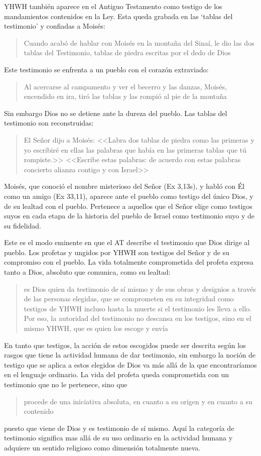 YHWH también aparece en el Antiguo Testamento como testigo de los mandamientos contenidos en la Ley\autocite[Cf.~][115]{prades2015testimonio}. Esta queda grabada en las `tablas del testimonio' y confiadas a Moisés: \blockquote[][\,(Ex 31,18)]{Cuando acabó de hablar con Moisés en la montaña del Sinaí, le dio las dos tablas del Testimonio, tablas de piedra escritas por el dedo de Dios}. Este testimonio se enfrenta a un pueblo con el corazón extraviado: \blockquote[][\,(Ex 32,19)]{Al acercarse al campamento y ver el becerro y las danzas, Moisés, encendido en ira, tiró las tablas y las rompió al pie de la montaña}. Sin embargo Dios no se detiene ante la dureza del pueblo. Las tablas del testimonio son reconstruidas: \blockquote[][\,(Ex 34,1.27)]{El Señor dijo a Moisés: <<Labra dos tablas de piedra como las primeras y yo escribiré en ellas las palabras que había en las primeras tablas que tú rompiste.>> \textelp{} <<Escribe estas palabras: de acuerdo con estas palabras concierto alianza contigo y con Israel>>}. Moisés, que conoció el nombre misterioso del Señor (Ex 3,13s), y habló con Él como un amigo (Ex 33,11), aparece ante el pueblo como testigo del único Dios, y de su lealtad con el pueblo. Pertenece a aquellos que el Señor elige como testigos suyos en cada etapa de la historia del pueblo de Israel como testimonio suyo y de su fidelidad.

Este es el modo eminente en que el AT describe el testimonio que Dios dirige al pueblo. Los profetas y ungidos por YHWH son testigos del Señor y de su compromiso con el pueblo. La vida totalmente comprometida del profeta expresa tanto a Dios, absoluto que comunica, como su lealtad: \blockquote[{\cite[116s]{prades2015testimonio}}]{es Dios quien da testimonio de sí mismo y de sus obras y designios a través de las personas elegidas, que se comprometen en su integridad como testigos de YHWH incluso hasta la muerte si el testimonio les lleva a ello. Por eso, la autoridad del testimonio no descansa en los testigos, sino en el mismo YHWH, que es quien los escoge y envía}. En tanto que testigos, la acción de estos escogidos puede ser descrita según los rasgos que tiene la actividad humana de dar testimonio, sin embargo la noción de testigo que se aplica a estos elegidos de Dios va más allá de la que encontraríamos en el lenguaje ordinario. La vida del profeta queda comprometida con un testimonio que no le pertenece, sino que \blockquote[{\cite[118]{prades2015testimonio}}]{procede de una iniciativa absoluta, en cuanto a su origen y en cuanto a su contenido} puesto que viene de Dios y es testimonio de sí mismo. Aquí la categoría de testimonio significa mas allá de su uso ordinario en la actividad humana y adquiere un sentido religioso como dimensión totalmente nueva\autocite[Cf.~][118]{prades2015testimonio}.

